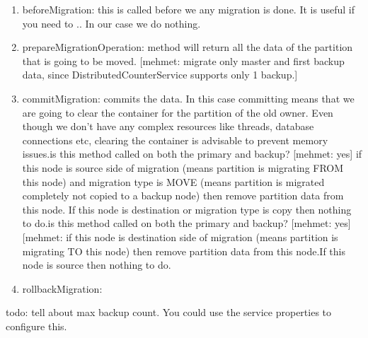 \begin{enumerate}
\item beforeMigration: this is called before we any migration is done. It is useful if you need to .. In our case we do nothing.
\item prepareMigrationOperation: method will return all the data of the partition that is going to be moved.
[mehmet: migrate only master and first backup data, since DistributedCounterService supports only 1 backup.]
\item commitMigration: commits the data. In this case committing means that we are going to clear the container for the partition of the old owner. Even though we don't have any complex resources like threads, database connections etc, clearing the container is advisable to prevent memory issues.is this method called on both the primary and backup? [mehmet: yes] if this node is source side of migration (means partition is migrating FROM this node) and migration type is MOVE (means partition is migrated completely not copied to a backup node) then remove partition data from this node. If this node is destination or migration type is copy then nothing to do.is this method called on both the primary and backup? [mehmet: yes][mehmet: if this node is destination side of migration (means partition is migrating TO this node) then remove partition data from this node.If this node is source then nothing to do.
\item rollbackMigration: 
\end{enumerate}

todo: tell about max backup count. You could use the service properties to configure this.

